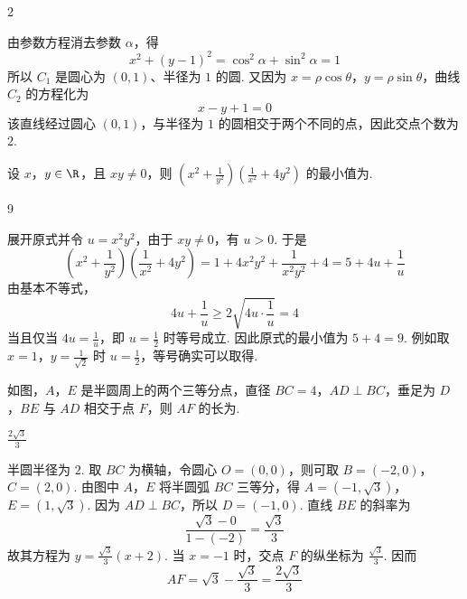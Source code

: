 \begin{answer}
2
\end{answer}

\begin{solution}
由参数方程消去参数 \(\alpha\)，得
\[
x^2+(y-1)^2=\cos^2\alpha+\sin^2\alpha=1
\]
所以 \(C_1\) 是圆心为 \((0,1)\)、半径为 \(1\) 的圆. 又因为 \(x=\rho\cos\theta\)，\(y=\rho\sin\theta\)，曲线 \(C_2\) 的方程化为
\[
x-y+1=0
\]
该直线经过圆心 \((0,1)\)，与半径为 \(1\) 的圆相交于两个不同的点，因此交点个数为 \(2\).
\end{solution}

\begin{problem}
设 \(x\)，\(y \in \R\)，且 \(xy \neq 0\)，则 \(\left(x^2 + \frac{1}{y^2}\right)\left(\frac{1}{x^2} + 4y^2\right)\) 的最小值为\fillinblank{}.
\end{problem}

\begin{answer}
9
\end{answer}

\begin{solution}
展开原式并令 \(u=x^2y^2\)，由于 \(xy\ne0\)，有 \(u>0\). 于是
\[
\left(x^2+\frac1{y^2}\right)\left(\frac1{x^2}+4y^2\right)
=1+4x^2y^2+\frac1{x^2y^2}+4
=5+4u+\frac1u
\]
由基本不等式，
\[
4u+\frac1u\geqslant2\sqrt{4u\cdot\frac1u}=4
\]
当且仅当 \(4u=\frac1u\)，即 \(u=\frac12\) 时等号成立. 因此原式的最小值为 \(5+4=9\). 例如取 \(x=1\)，\(y=\frac{1}{\sqrt2}\) 时 \(u=\frac12\)，等号确实可以取得.
\end{solution}

\begin{problem}
如图，\(A\)，\(E\) 是半圆周上的两个三等分点，直径 \(BC=4\)，\(AD\perp BC\)，垂足为 \(D\)，\(BE\) 与 \(AD\) 相交于点 \(F\)，则 \(AF\) 的长为\fillinblank{}.

\end{problem}

\begin{answer}
\(\frac{2\sqrt{3}}{3}\)
\end{answer}

\begin{solution}
半圆半径为 \(2\). 取 \(BC\) 为横轴，令圆心 \(O=(0,0)\)，则可取
\(B=(-2,0)\)，\(C=(2,0)\).
由图中 \(A\)，\(E\) 将半圆弧 \(BC\) 三等分，得
\(A=(-1,\sqrt3)\)，\(E=(1,\sqrt3)\).
因为 \(AD\perp BC\)，所以 \(D=(-1,0)\). 直线 \(BE\) 的斜率为
\[
\frac{\sqrt3-0}{1-(-2)}=\frac{\sqrt3}{3}
\]
故其方程为 \(y=\frac{\sqrt3}{3}(x+2)\). 当 \(x=-1\) 时，交点 \(F\) 的纵坐标为 \(\frac{\sqrt3}{3}\). 因而
\[
AF=\sqrt3-\frac{\sqrt3}{3}=\frac{2\sqrt3}{3}
\]
\end{solution}

